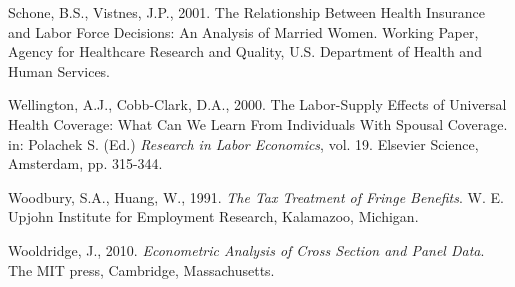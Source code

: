 \documentclass[legno,11pt]{article}
\begin{document}
\begin{thebibliography}{12}

 Schone, B.S., Vistnes, J.P., 2001.
                 The Relationship Between Health Insurance and Labor Force Decisions: An Analysis of Married Women.
                 Working Paper, Agency for Healthcare Research and Quality, U.S. Department of Health and Human Services.

%
%

 Wellington, A.J., Cobb-Clark, D.A., 2000.
                 The Labor-Supply Effects of Universal Health Coverage: What Can We Learn From Individuals With Spousal Coverage.
                  in: Polachek S. (Ed.) \emph{Research in Labor Economics}, vol. 19. Elsevier Science, Amsterdam, pp. 315-344.

 Woodbury, S.A., Huang, W., 1991.
                  \emph{The Tax Treatment of Fringe Benefits}. W. E. Upjohn Institute for Employment Research, Kalamazoo, Michigan.


 Wooldridge, J., 2010. \emph{Econometric Analysis of Cross Section and Panel Data}.
                 The MIT press, Cambridge, Massachusetts.

\end{thebibliography}
\end{document}
